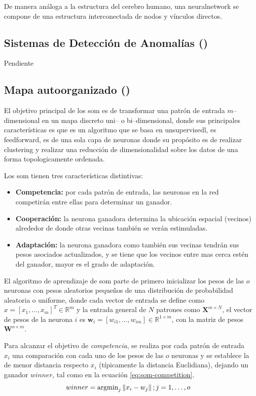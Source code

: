 De manera análoga a la estructura del cerebro humano, una \gls{neuralnetwork} se compone de una estructura interconectada de nodos y vínculos directos.

\subsection{Sistemas de Detección de Anomalías ()}
Pendiente

\subsection{Mapa autoorganizado ()} \label{subsec:SOM}
El objetivo principal de los \gls{som} es de transformar una patrón de entrada $m$--dimensional en un mapa discreto uni-- o bi--dimensional, donde sus principales características es que es un algoritmo que se basa en \gls{unsupervisedl}, es \gls{feedforward}, es de una sola capa de neuronas donde su propósito es de realizar \gls{clustering} y realizar una reducción de dimensionalidad sobre los datos de una forma topologicamente ordenada.

Los \gls{som} tienen tres características distintivas:
\begin{itemize}
\item {\bf Competencia:} por cada patrón de entrada, las neuronas en la red competirán entre ellas para determinar un ganador.
\item {\bf Cooperación:} la neurona ganadora determina la ubicación espacial (vecinos) alrededor de donde otras vecinas también se verán estimuladas.
\item {\bf Adaptación:} la neurona ganadora como también sus vecinas tendrán sus pesos asociados actualizados, y se tiene que los vecinos entre mas cerca estén del ganador, mayor es el grado de adaptación.
\end{itemize}

El algoritmo de aprendizaje de \gls{som} parte de primero inicializar los pesos de las $o$ neuronas con pesos aleatorios pequeños de una distribución de probabilidad aleatoria o uniforme, donde cada vector de entrada se define como $x = [x_1, \ldots, x_m]^{T} \in \mathbb{R}^{m}$ y la entrada general de $N$ patrones como $\mathbf{X}^{m \times N}$, el vector de pesos de la neurona $i$ es $\mathbf{w}_i = [w_{i1}, \ldots, w_{im}] \in \mathbb{R}^{1 \times m}$, con la matriz de pesos $\mathbf{W}^{o \times m}$.

Para alcanzar el objetivo de \emph{competencia}, se realiza por cada patrón de entrada $x_i$ una comparación con cada uno de los pesos de las $o$ neuronas y se establece la de menor distancia respecto $x_i$ (típicamente la distancia Euclidiana), dejando un ganador $winner$, tal como en la ecuación \ref{eq:som-competition}.
\begin{equation} \label{eq:som-competition}
  winner = \text{argmin}_j \left\lVert x_i - w_j\right\rVert ; j = 1, \ldots,o
\end{equation}

